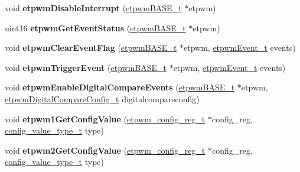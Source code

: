 \begin{DoxyCompactItemize}
void {\bfseries etpwm\+Disable\+Interrupt} (\mbox{\hyperlink{reg__etpwm_8h_a3030c3a8f18ffd60ee3de5bbd7632891}{etpwm\+B\+A\+S\+E\+\_\+t}} $\ast$etpwm)
\item 
\mbox{\label{group__ePWM_gaaa1e46318eca04bdee08edc3e8b4f255}} 
uint16 {\bfseries etpwm\+Get\+Event\+Status} (\mbox{\hyperlink{reg__etpwm_8h_a3030c3a8f18ffd60ee3de5bbd7632891}{etpwm\+B\+A\+S\+E\+\_\+t}} $\ast$etpwm)
\item 
\mbox{\label{group__ePWM_ga7d3982e45aa1b2532c126e24b8457402}} 
void {\bfseries etpwm\+Clear\+Event\+Flag} (\mbox{\hyperlink{reg__etpwm_8h_a3030c3a8f18ffd60ee3de5bbd7632891}{etpwm\+B\+A\+S\+E\+\_\+t}} $\ast$etpwm, \mbox{\hyperlink{etpwm_8h_abd6fb2a9c5d4ba6336431292ba59050a}{etpwm\+Event\+\_\+t}} events)
\item 
\mbox{\label{group__ePWM_gac40c5718cbfec4e4374091980e91fc76}} 
void {\bfseries etpwm\+Trigger\+Event} (\mbox{\hyperlink{reg__etpwm_8h_a3030c3a8f18ffd60ee3de5bbd7632891}{etpwm\+B\+A\+S\+E\+\_\+t}} $\ast$etpwm, \mbox{\hyperlink{etpwm_8h_abd6fb2a9c5d4ba6336431292ba59050a}{etpwm\+Event\+\_\+t}} events)
\item 
\mbox{\label{group__ePWM_ga0b5a755547dac3076fe6ce48b8adc18a}} 
void {\bfseries etpwm\+Enable\+Digital\+Compare\+Events} (\mbox{\hyperlink{reg__etpwm_8h_a3030c3a8f18ffd60ee3de5bbd7632891}{etpwm\+B\+A\+S\+E\+\_\+t}} $\ast$etpwm, \mbox{\hyperlink{structetpwmDigitalCompareConfig__t}{etpwm\+Digital\+Compare\+Config\+\_\+t}} digitalcompareconfig)
\item 
\mbox{\label{group__ePWM_gab902bd9bc2c6bb0c571bada7f353e80b}} 
void {\bfseries etpwm1\+Get\+Config\+Value} (\mbox{\hyperlink{structetpwm__config__reg}{etpwm\+\_\+config\+\_\+reg\+\_\+t}} $\ast$config\+\_\+reg, \mbox{\hyperlink{sys__common_8h_a9daf9a5992391b058477d28d107ee5e2}{config\+\_\+value\+\_\+type\+\_\+t}} type)
\item 
\mbox{\label{group__ePWM_gad4cebff50483ed7a3cf04e1afad5dea5}} 
void {\bfseries etpwm2\+Get\+Config\+Value} (\mbox{\hyperlink{structetpwm__config__reg}{etpwm\+\_\+config\+\_\+reg\+\_\+t}} $\ast$config\+\_\+reg, \mbox{\hyperlink{sys__common_8h_a9daf9a5992391b058477d28d107ee5e2}{config\+\_\+value\+\_\+type\+\_\+t}} type)
\item 

\end{DoxyCompactItemize}
